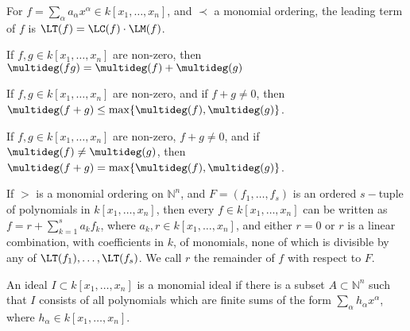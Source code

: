                \begin{definition}
                    For
                    $f=\sum_{\alpha}%
                       a_{\alpha}x^{\alpha}\in{k}[x_{1},\hdots,x_{n}]$,
                    and $\prec$ a monomial ordering,
                    the leading term of $f$ is
                    $\LT(f)=\LC(f)\cdot\LM(f)$.
                \end{definition}
                \begin{theorem}
                    If $f,g\in k[x_1,\hdots ,x_n]$ are non-zero,
                    then $\multideg(fg)=\multideg(f)+\multideg(g)$
                \end{theorem}
                \begin{theorem}
                    If $f,g\in k[x_1,\hdots ,x_n]$ are non-zero,
                    and if $f+g\ne 0$, then
                    $\multideg(f+g)\leq\max\{\multideg(f),\multideg(g)\}$.
                \end{theorem}
                \begin{theorem}
                    If $f,g\in k[x_1,\hdots ,x_n]$ are non-zero,
                    $f+g\ne 0$, and if
                    $\multideg(f)\ne\multideg(g)$, then
                    $\multideg(f+g)=\max\{\multideg(f),\multideg(g)\}$.
                \end{theorem}
                \begin{theorem}
                    If $>$ is a monomial ordering on $\mathbb{N}^n$,
                    and $F=(f_1,\hdots,f_s)$ is an ordered $s-$tuple
                    of polynomials in $k[x_1,\hdots ,x_n]$,
                    then every $f\in k[x_1,\hdots ,x_n]$ can be
                    written as $f=r+\sum_{k=1}^{s}a_{k}f_{k}$,
                    where $a_{k},r\in{k}[x_{1},\hdots,x_{n}]$,
                    and either $r=0$ or $r$ is a linear combination,
                    with coefficients in $k$, of monomials, none of
                    which is divisible by any of
                    $\LT(f_{1}),\hdots,\LT(f_{s})$.
                    We call $r$ the remainder of $f$
                    with respect to $F$.
                \end{theorem}
                \begin{definition}
                    An ideal $I\subset k[x_1,\hdots ,x_n]$ is a
                    monomial ideal if there is a subset
                    $A\subset\mathbb{N}^{n}$ such that $I$ consists
                    of all polynomials which are finite sums of
                    the form $\sum_{\alpha} h_{\alpha}x^{\alpha}$,
                    where $h_{\alpha}\in {k}[x_{1},\hdots,x_{n}]$. 
                \end{definition}
